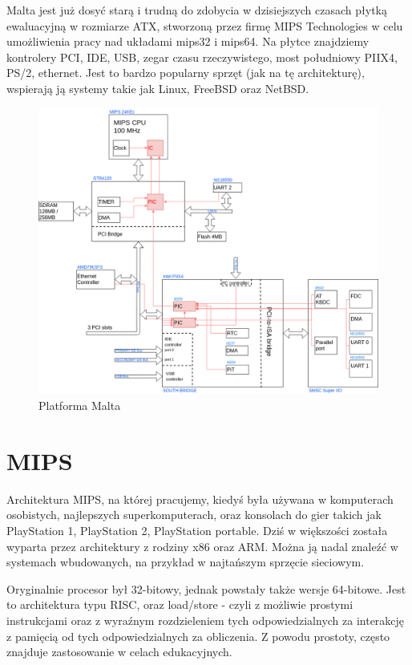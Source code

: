 \documentclass[shortabstract,inz]{iithesis}
\begin{document}
Malta jest już dosyć starą i trudną do zdobycia w dzisiejszych czasach
płytką ewaluacyjną w rozmiarze ATX, stworzoną przez firmę MIPS
Technologies w celu umożliwienia pracy nad układami mips32 i
mips64. Na płytce znajdziemy
kontrolery PCI, IDE, USB, zegar czasu rzeczywistego, most południowy
PIIX4, PS/2, ethernet.  Jest to bardzo popularny sprzęt (jak na tę
architekturę), wspierają ją systemy takie jak Linux, FreeBSD oraz
NetBSD.



\begin{figure}	
  \begin{center}	
    \includegraphics[width=\linewidth]{malta}	
  \caption{Platforma Malta}	
\end{center}	
\end{figure}

\section{MIPS} %
Architektura MIPS\cite{mips24k}, na której
pracujemy, kiedyś była używana w komputerach osobistych, najlepszych
superkomputerach, oraz konsolach do gier takich jak PlayStation 1,
PlayStation 2, PlayStation portable.  Dziś w większości została
wyparta przez architektury z rodziny x86 oraz ARM. Można ją nadal
znaleźć w systemach wbudowanych, na przykład w najtańszym sprzęcie
sieciowym.

Oryginalnie procesor był 32-bitowy, jednak powstały także wersje 64-bitowe. Jest
to architektura typu RISC, oraz load/store - czyli z możliwie prostymi
instrukcjami oraz z wyraźnym rozdzieleniem tych odpowiedzialnych za
interakcję z pamięcią od tych odpowiedzialnych za obliczenia. Z powodu
prostoty, często znajduje zastosowanie w celach edukacyjnych.
\end{document}
